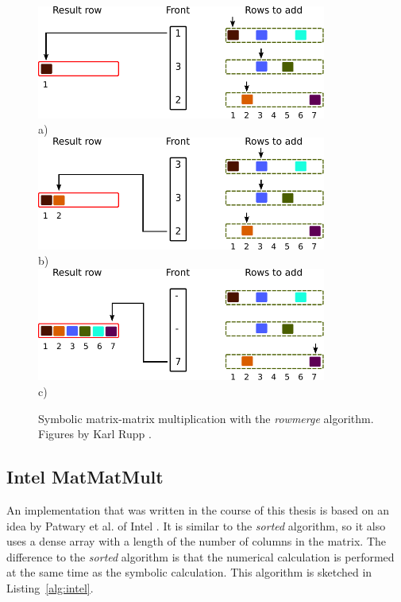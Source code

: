 \begin{figure}[H]
\centering
\includegraphics[width=0.85\textwidth]{row/spgemm-row-1}\\
a)\\
\vspace*{6mm}
\includegraphics[width=0.85\textwidth]{row/spgemm-row-2}\\
b)\\
\vspace*{6mm}
\includegraphics[width=0.85\textwidth]{row/spgemm-row-6}\\
c)\\
\vspace*{6mm}
\caption{Symbolic matrix-matrix multiplication with the \textit{rowmerge} algorithm. Figures by Karl Rupp \cite{karli_LANS_image}.}
\label{fig:spgemm-row}
\end{figure}


\subsection{Intel MatMatMult}
An implementation that was written in the course of this thesis is based on an idea by Patwary et al. of Intel \cite{intel_algorithm}. It is similar to the \textit{sorted} algorithm, so it also uses a dense array with a length of the number of columns in the matrix. The difference to the \textit{sorted} algorithm is that the  numerical calculation is performed at the same time as the symbolic calculation. This algorithm is sketched in Listing~\ref{alg:intel}.

